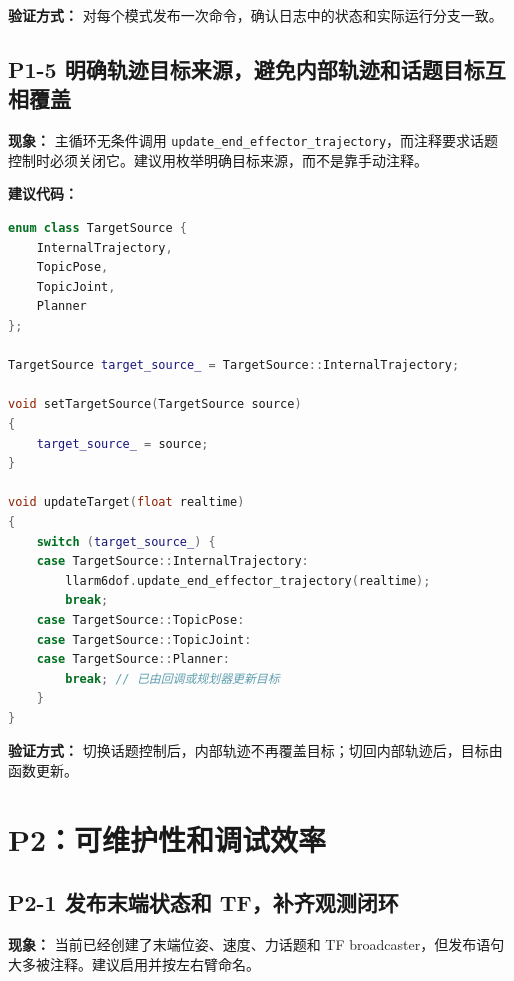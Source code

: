 \documentclass[UTF8,a4paper,11pt]{ctexart}
\begin{document}
\textbf{验证方式：} 对每个模式发布一次命令，确认日志中的状态和实际运行分支一致。

\subsection{P1-5 明确轨迹目标来源，避免内部轨迹和话题目标互相覆盖}

\textbf{现象：} 主循环无条件调用 \verb|update_end_effector_trajectory|，而注释要求话题控制时必须关闭它。建议用枚举明确目标来源，而不是靠手动注释。

\textbf{建议代码：}
\begin{lstlisting}[language=C++]
enum class TargetSource {
    InternalTrajectory,
    TopicPose,
    TopicJoint,
    Planner
};

TargetSource target_source_ = TargetSource::InternalTrajectory;

void setTargetSource(TargetSource source)
{
    target_source_ = source;
}

void updateTarget(float realtime)
{
    switch (target_source_) {
    case TargetSource::InternalTrajectory:
        llarm6dof.update_end_effector_trajectory(realtime);
        break;
    case TargetSource::TopicPose:
    case TargetSource::TopicJoint:
    case TargetSource::Planner:
        break; // 已由回调或规划器更新目标
    }
}
\end{lstlisting}

\textbf{验证方式：} 切换话题控制后，内部轨迹不再覆盖目标；切回内部轨迹后，目标由函数更新。

\section{P2：可维护性和调试效率}

\subsection{P2-1 发布末端状态和 TF，补齐观测闭环}

\textbf{现象：} 当前已经创建了末端位姿、速度、力话题和 TF broadcaster，但发布语句大多被注释。建议启用并按左右臂命名。
\end{document}
